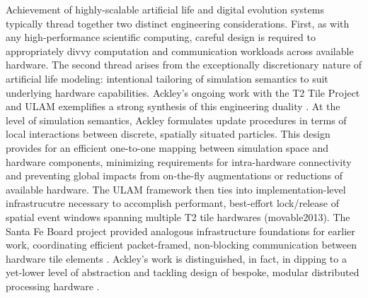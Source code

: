 Achievement of highly-scalable artificial life and digital evolution systems typically thread together two distinct engineering considerations.
First, as with any high-performance scientific computing, careful design is required to appropriately divvy computation and communication workloads across available hardware.
The second thread arises from the exceptionally discretionary nature of artificial life modeling: intentional tailoring of simulation semantics to suit underlying hardware capabilities.
Ackley's ongoing work with the T2 Tile Project and ULAM exemplifies a strong synthesis of this engineering duality \citep{CITEULAM}.
At the level of simulation semantics, Ackley formulates update procedures in terms of local interactions between discrete, spatially situated particles.
This design provides for an efficient one-to-one mapping between simulation space and hardware components, minimizing requirements for intra-hardware connectivity and preventing global impacts from on-the-fly augmentations or reductions of available hardware.
The ULAM framework then ties into implementation-level infrastrucutre necessary to accomplish performant, best-effort lock/release of spatial event windows spanning multiple T2 tile hardwares (movable2013).
The Santa Fe Board project provided analogous infrastructure foundations for earlier work, coordinating efficient packet-framed, non-blocking communication between hardware tile elements \citep{https://livingcomputation.com/s/doc/}.
Ackley's work is distinguished, in fact, in dipping to a yet-lower level of abstraction and tackling design of bespoke, modular distributed processing hardware \citep{ILLUMINAXMACHINA,T2PROJECT}.

